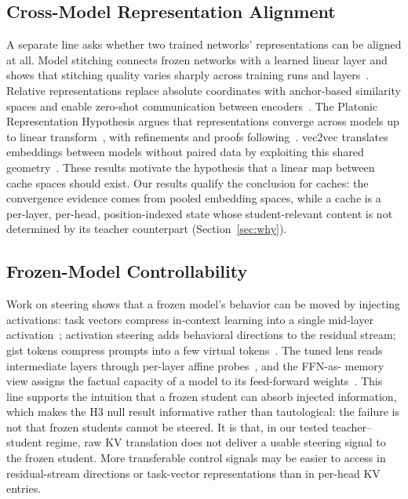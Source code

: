 \documentclass[10pt]{article}
\begin{document}
\subsection{Cross-Model Representation Alignment}
A separate line asks whether two trained networks' representations can be
aligned at all. Model stitching connects frozen networks with a learned
linear layer and shows that stitching quality varies sharply across training
runs and layers~\citep{stitching2021}. Relative representations replace
absolute coordinates with anchor-based similarity spaces and enable zero-shot
communication between encoders~\citep{relrep2022}. The Platonic Representation
Hypothesis argues that representations converge across models up to linear
transform~\citep{platonic2024}, with refinements and proofs
following~\citep{aristotelian2026,perfectplatonic2025}. vec2vec translates
embeddings between models without paired data by exploiting this shared
geometry~\citep{vec2vec2025}. These results motivate the hypothesis that a
linear map between cache spaces should exist. Our results qualify the
conclusion for caches: the convergence evidence comes from pooled embedding
spaces, while a cache is a per-layer, per-head, position-indexed state whose
student-relevant content is not determined by its teacher counterpart
(Section~\ref{sec:why}).

\subsection{Frozen-Model Controllability}
Work on steering shows that a frozen model's behavior can be moved by
injecting activations: task vectors compress in-context learning into a
single mid-layer activation~\citep{taskvectors2023}; activation steering adds
behavioral directions to the residual stream; gist tokens compress prompts
into a few virtual tokens~\citep{gist2023}. The tuned lens reads intermediate
layers through per-layer affine probes~\citep{tunedlens2023}, and the FFN-as-
memory view assigns the factual capacity of a model to its feed-forward
weights~\citep{ffnmemory2021}. This line supports the intuition that a frozen
student can absorb injected information, which makes the H3 null result
informative rather than tautological: the failure is not that frozen students
cannot be steered. It is that, in our tested teacher--student regime, raw KV
translation does not deliver a usable steering signal to the frozen student.
More transferable control signals may be easier to access in residual-stream
directions or task-vector representations than in per-head KV entries.
\end{document}
